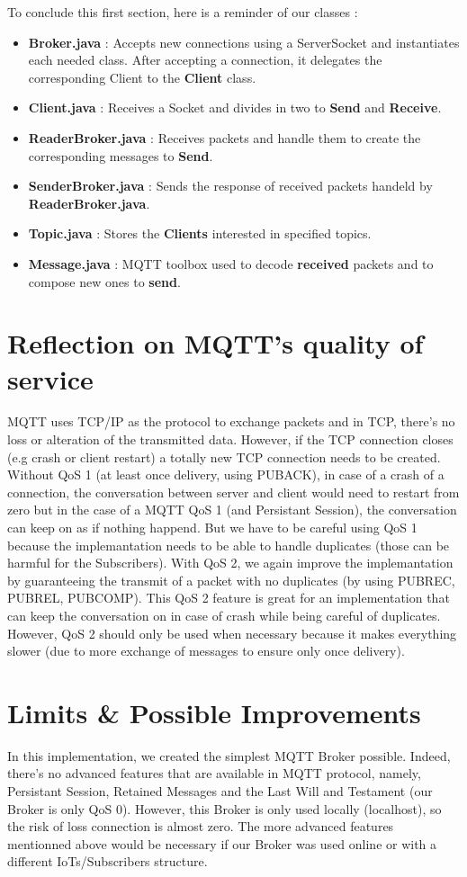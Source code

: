 \documentclass[12pt]{article}
\begin{document}
To conclude this first section, here is a reminder of our classes :
\begin{itemize}
	\item \textbf{Broker.java} : Accepts new connections using a ServerSocket and instantiates each needed class. After accepting a connection, it delegates 
	the corresponding Client to the \textbf{Client} class.
	\item \textbf{Client.java} : Receives a Socket and divides in two to \textbf{Send} and \textbf{Receive}.
	\item \textbf{ReaderBroker.java} : Receives packets and handle them to create the corresponding messages to \textbf{Send}.
	\item \textbf{SenderBroker.java} : Sends the response of received packets handeld by \textbf{ReaderBroker.java}.
	\item \textbf{Topic.java} : Stores the \textbf{Clients} interested in specified topics.
	\item \textbf{Message.java} : MQTT toolbox used to decode \textbf{received} packets and to compose new ones to \textbf{send}.
\end{itemize}

\section{Reflection on MQTT's quality of service}
MQTT uses TCP/IP as the protocol to exchange packets and in TCP, there's no loss or alteration of the transmitted data. However, if the TCP connection 
closes (e.g crash or client restart) a totally new TCP connection needs to be created. Without QoS 1 (at least once delivery, using PUBACK), in case of a crash of a connection, 
the conversation between server and client would need to restart from zero but in the case of a MQTT QoS 1 (and Persistant Session), the conversation can keep on as if nothing happend. But we have to be careful using QoS 1 because 
the implemantation needs to be able to handle duplicates (those can be harmful for the Subscribers). With QoS 2, we again improve the implemantation by guaranteeing the transmit of a packet with no duplicates (by using PUBREC, PUBREL, PUBCOMP). 
This QoS 2 feature is great for an implementation that can keep the conversation on in case of crash while being careful of duplicates. However, QoS 2 should only be used when necessary because it makes everything slower (due to more exchange of messages to ensure only once delivery).

\section{Limits \& Possible Improvements}
In this implementation, we created the simplest MQTT Broker possible. Indeed, there's no advanced features that are available in MQTT protocol, namely, Persistant Session, 
Retained Messages and the Last Will and Testament (our Broker is only QoS 0). However, this Broker is only used locally (localhost), so the risk of loss connection is almost zero. 
The more advanced features mentionned above would be necessary if our Broker was used online or with a different IoTs/Subscribers structure. 
\end{document}
